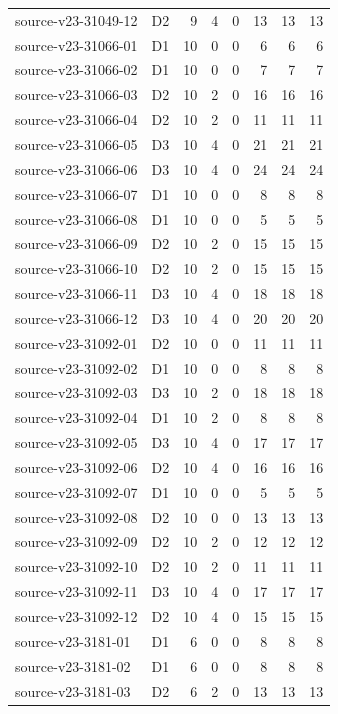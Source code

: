\begin{longtable}{p{}lrrrrrr}
source-v23-31049-12 & D2 & 9 & 4 & 0 & 13 & 13 & 13\\
source-v23-31066-01 & D1 & 10 & 0 & 0 & 6 & 6 & 6\\
source-v23-31066-02 & D1 & 10 & 0 & 0 & 7 & 7 & 7\\
source-v23-31066-03 & D2 & 10 & 2 & 0 & 16 & 16 & 16\\
source-v23-31066-04 & D2 & 10 & 2 & 0 & 11 & 11 & 11\\
source-v23-31066-05 & D3 & 10 & 4 & 0 & 21 & 21 & 21\\
source-v23-31066-06 & D3 & 10 & 4 & 0 & 24 & 24 & 24\\
source-v23-31066-07 & D1 & 10 & 0 & 0 & 8 & 8 & 8\\
source-v23-31066-08 & D1 & 10 & 0 & 0 & 5 & 5 & 5\\
source-v23-31066-09 & D2 & 10 & 2 & 0 & 15 & 15 & 15\\
source-v23-31066-10 & D2 & 10 & 2 & 0 & 15 & 15 & 15\\
source-v23-31066-11 & D3 & 10 & 4 & 0 & 18 & 18 & 18\\
source-v23-31066-12 & D3 & 10 & 4 & 0 & 20 & 20 & 20\\
source-v23-31092-01 & D2 & 10 & 0 & 0 & 11 & 11 & 11\\
source-v23-31092-02 & D1 & 10 & 0 & 0 & 8 & 8 & 8\\
source-v23-31092-03 & D3 & 10 & 2 & 0 & 18 & 18 & 18\\
source-v23-31092-04 & D1 & 10 & 2 & 0 & 8 & 8 & 8\\
source-v23-31092-05 & D3 & 10 & 4 & 0 & 17 & 17 & 17\\
source-v23-31092-06 & D2 & 10 & 4 & 0 & 16 & 16 & 16\\
source-v23-31092-07 & D1 & 10 & 0 & 0 & 5 & 5 & 5\\
source-v23-31092-08 & D2 & 10 & 0 & 0 & 13 & 13 & 13\\
source-v23-31092-09 & D2 & 10 & 2 & 0 & 12 & 12 & 12\\
source-v23-31092-10 & D2 & 10 & 2 & 0 & 11 & 11 & 11\\
source-v23-31092-11 & D3 & 10 & 4 & 0 & 17 & 17 & 17\\
source-v23-31092-12 & D2 & 10 & 4 & 0 & 15 & 15 & 15\\
source-v23-3181-01 & D1 & 6 & 0 & 0 & 8 & 8 & 8\\
source-v23-3181-02 & D1 & 6 & 0 & 0 & 8 & 8 & 8\\
source-v23-3181-03 & D2 & 6 & 2 & 0 & 13 & 13 & 13\\

\end{longtable}
